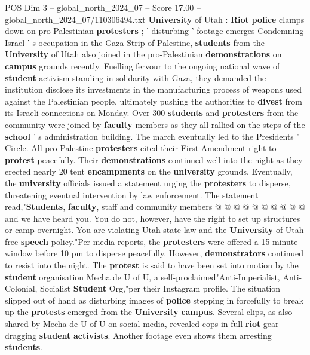 \begin{textsample}{POS Dim 3 – global\_north\_2024\_07 – Score 17.00 – global\_north\_2024\_07/110306494.txt}  \label{ex:f3_pos_089}
\textbf{University} of Utah : \textbf{Riot} \textbf{police} clamps down on pro-Palestinian \textbf{protesters} ; ' disturbing ' footage emerges Condemning Israel ' s occupation in the Gaza Strip of Palestine, \textbf{students} from the \textbf{University} of Utah also joined in the pro-Palestinian \textbf{demonstrations} on \textbf{campus} grounds recently.
Fuelling fervour to the ongoing national wave of \textbf{student} activism standing in solidarity with Gaza, they demanded the institution disclose its investments in the manufacturing process of weapons used against the Palestinian people, ultimately pushing the authorities to \textbf{divest} from its Israeli connections on Monday.
Over 300 \textbf{students} and \textbf{protesters} from the community were joined by \textbf{faculty} members as they all rallied on the steps of the \textbf{school} ' s administration building.
The march eventually led to the Presidents ' Circle.
All pro-Palestine \textbf{protesters} cited their First Amendment right to \textbf{protest} peacefully.
Their \textbf{demonstrations} continued well into the night as they erected nearly 20 tent \textbf{encampments} on the \textbf{university} grounds.
Eventually, the \textbf{university} officials issued a statement urging the \textbf{protesters} to disperse, threatening eventual intervention by law enforcement.
The statement read,"\textbf{Students}, \textbf{faculty}, staff and community members @ @ @ @ @ @ @ @ @ @ and we have heard you.
You do not, however, have the right to set up structures or camp overnight.
You are violating Utah state law and the \textbf{University} of Utah free \textbf{speech} policy."Per media reports, the \textbf{protesters} were offered a 15-minute window before 10 pm to disperse peacefully.
However, \textbf{demonstrators} continued to resist into the night.
The \textbf{protest} is said to have been set into motion by the \textbf{student} organisation Mecha de U of U, a self-proclaimed"Anti-Imperialist, Anti-Colonial, Socialist \textbf{Student} Org,"per their Instagram profile.
The situation slipped out of hand as disturbing images of \textbf{police} stepping in forcefully to break up the \textbf{protests} emerged from the \textbf{University} \textbf{campus}.
Several clips, as also shared by Mecha de U of U on social media, revealed cops in full \textbf{riot} gear dragging \textbf{student} \textbf{activists}.
Another footage even shows them arresting \textbf{students}.

\end{textsample}
